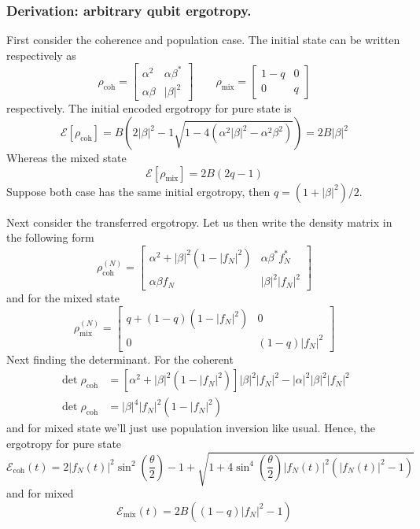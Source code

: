 \documentclass[../../../main.tex]{subfiles}
\begin{document}
\subsubsection{Derivation: arbitrary qubit ergotropy.}
First consider the coherence and population case.
The initial state can be written respectively as
\begin{equation*}
  \rho_\text{coh}
  = \begin{bmatrix}
    \alpha^2    & \alpha\beta^* \\
    \alpha\beta & |\beta|^2
  \end{bmatrix}
  \qquad
  \rho_\text{mix}
  = \begin{bmatrix}
    1-q & 0 \\
    0   & q
  \end{bmatrix}
\end{equation*}
respectively.
The initial encoded ergotropy for pure state is
\begin{equation*}
  \mathcal{E}[\rho_\text{coh}]
  = B(2|\beta|^2-1 \sqrt{1-4(\alpha^2|\beta|^2-\alpha^2\beta^2)})
  = 2B|\beta|^2
\end{equation*}
Whereas the mixed state
\begin{equation*}
  \mathcal{E}[\rho_\text{mix}] = 2B(2q- 1)
\end{equation*}
Suppose both case has the same initial ergotropy, then $q = (1+|\beta|^2)/2$.

Next consider the transferred ergotropy.
Let us then write the density matrix in the following form
\begin{equation*}
  \rho_\text{coh}^{(N)}
  = \begin{bmatrix}
    \alpha^2 + |\beta|^2 (1-|f_N|^2) & \alpha\beta^*  f_N^* \\
    \alpha\beta  f_N                 & |\beta|^2 |f_N|^2
  \end{bmatrix}
\end{equation*}
and for the mixed state
\begin{equation*}
  \rho_\text{mix}^{(N)}
  = \begin{bmatrix}
    q + (1-q) (1-|f_N|^2) & 0            \\
    0                     & (1-q)|f_N|^2
  \end{bmatrix}
\end{equation*}
Next finding the determinant.
For the coherent
\begin{align*}
  \det \rho_\text{coh} & = [\alpha^2 + |\beta|^2 (1-|f_N|^2)]|\beta|^2|f_N|^2 - |\alpha|^2|\beta|^2|f_N|^2 \\
  \det \rho_\text{coh} & = |\beta|^4|f_N|^2 (1-|f_N|^2)
\end{align*}
and for mixed state we'll just use population inversion like usual.
Hence, the ergotropy for pure state
\begin{equation*}
  \mathcal{E}_\text{coh} (t) = 2|f_N(t)|^2\sin^2\left(\frac{\theta}{2}\right)-1+\sqrt{1+4\sin^4\left(\frac{\theta}{2}\right)|f_N(t)|^2\left(|f_N(t)|^2-1\right)}
\end{equation*}
and for mixed
\begin{equation*}
  \mathcal{E}_\text{mix}(t) = 2B((1-q)|f_N|^2-1)
\end{equation*}
\end{document}
